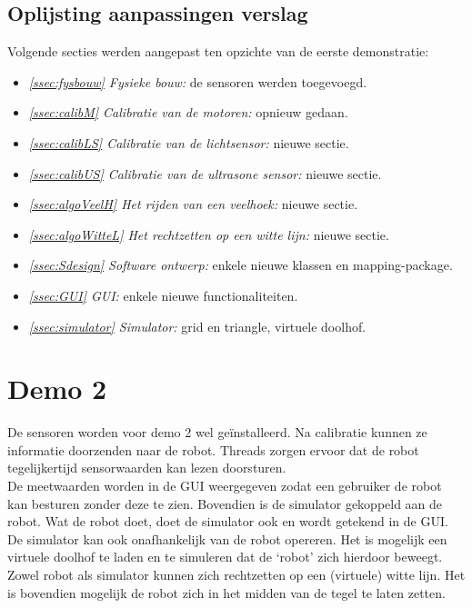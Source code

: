 \documentclass[tt3]{penoverslag}
\begin{document}
\subsection{Oplijsting aanpassingen verslag} %
\label{Assec:aanp1}
Volgende secties werden aangepast ten opzichte van de eerste demonstratie:

\begin{itemize}
\item \textit{\ref{ssec:fysbouw} Fysieke bouw:} de sensoren werden toegevoegd.
\item \textit{\ref{ssec:calibM} Calibratie van de motoren:} opnieuw gedaan.
\item \textit{\ref{ssec:calibLS} Calibratie van de lichtsensor:} nieuwe sectie.
\item \textit{\ref{ssec:calibUS} Calibratie van de ultrasone sensor:} nieuwe sectie.
\item \textit{\ref{ssec:algoVeelH} Het rijden van een veelhoek:} nieuwe sectie.
\item \textit{\ref{ssec:algoWitteL} Het rechtzetten op een witte lijn:} nieuwe sectie.
\item \textit{\ref{ssec:Sdesign} Software ontwerp:} enkele nieuwe klassen en mapping-package.
\item \textit{\ref{ssec:GUI} GUI:} enkele nieuwe functionaliteiten.
\item \textit{\ref{ssec:simulator} Simulator:} grid en triangle, virtuele doolhof.
\end{itemize}


\section{Demo 2} %
\label{Asec:demo2}
De sensoren worden voor demo 2 wel ge\"installeerd. Na calibratie kunnen ze informatie doorzenden naar de robot. Threads zorgen ervoor dat de robot tegelijkertijd sensorwaarden kan lezen doorsturen.\\

De meetwaarden worden in de GUI weergegeven zodat een gebruiker de robot kan besturen zonder deze te zien. Bovendien is de simulator gekoppeld aan de robot. Wat de robot doet, doet de simulator ook en wordt getekend in de GUI. De simulator kan ook onafhankelijk van de robot opereren. Het is mogelijk een virtuele doolhof te laden en te simuleren dat de `robot' zich hierdoor beweegt. Zowel robot als simulator kunnen zich rechtzetten op een (virtuele) witte lijn. Het is bovendien mogelijk de robot zich in het midden van de tegel te laten zetten.
\end{document}
